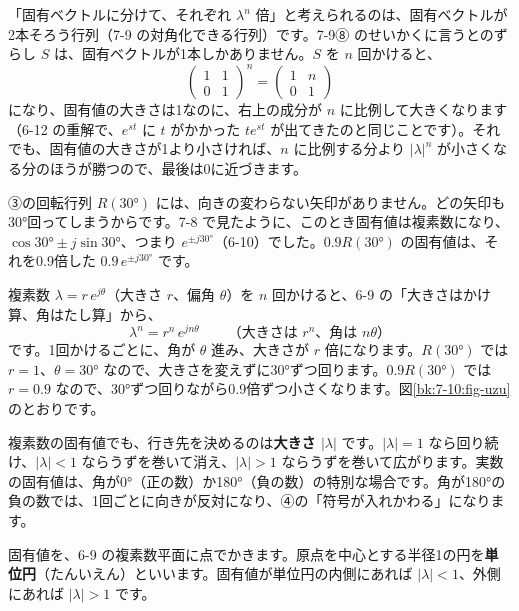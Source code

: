 \begin{seikaku}
「固有ベクトルに分けて、それぞれ $\lambda^n$ 倍」と考えられるのは、固有ベクトルが2本そろう行列（7-9 の対角化できる行列）です。7-9⑧ のせいかくに言うとのずらし $S$ は、固有ベクトルが1本しかありません。$S$ を $n$ 回かけると、
\[ \begin{pmatrix}1&1\\0&1\end{pmatrix}^n=\begin{pmatrix}1&n\\0&1\end{pmatrix} \]
になり、固有値の大きさは1なのに、右上の成分が $n$ に比例して大きくなります（6-12 の重解で、$e^{st}$ に $t$ がかかった $te^{st}$ が出てきたのと同じことです）。それでも、固有値の大きさが1より小さければ、$n$ に比例する分より $|\lambda|^n$ が小さくなる分のほうが勝つので、最後は0に近づきます。
\end{seikaku}


\label{bk:7-10:fukuso}③の回転行列 $R(30°)$ には、向きの変わらない矢印がありません。どの矢印も30°回ってしまうからです。7-8 で見たように、このとき固有値は複素数になり、$\cos30°\pm j\sin30°$、つまり $e^{\pm j30°}$（6-10）でした。$0.9R(30°)$ の固有値は、それを0.9倍した $0.9\,e^{\pm j30°}$ です。

複素数 $\lambda=r\,e^{j\theta}$（大きさ $r$、偏角 $\theta$）を $n$ 回かけると、6-9 の「大きさはかけ算、角はたし算」から、
\[ \lambda^n=r^n\,e^{jn\theta}\qquad\text{（大きさは $r^n$、角は $n\theta$）} \]
です。1回かけるごとに、角が $\theta$ 進み、大きさが $r$ 倍になります。$R(30°)$ では $r=1$、$\theta=30°$ なので、大きさを変えずに30°ずつ回ります。$0.9R(30°)$ では $r=0.9$ なので、30°ずつ回りながら0.9倍ずつ小さくなります。図\ref{bk:7-10:fig-uzu}のとおりです。

複素数の固有値でも、行き先を決めるのは\textbf{大きさ $|\lambda|$} です。$|\lambda|=1$ なら回り続け、$|\lambda|<1$ ならうずを巻いて消え、$|\lambda|>1$ ならうずを巻いて広がります。実数の固有値は、角が0°（正の数）か180°（負の数）の特別な場合です。角が180°の負の数では、1回ごとに向きが反対になり、④の「符号が入れかわる」になります。

固有値を、6-9 の複素数平面に点でかきます。原点を中心とする半径1の円を\textbf{単位円}（たんいえん）といいます。固有値が単位円の内側にあれば $|\lambda|<1$、外側にあれば $|\lambda|>1$ です。

